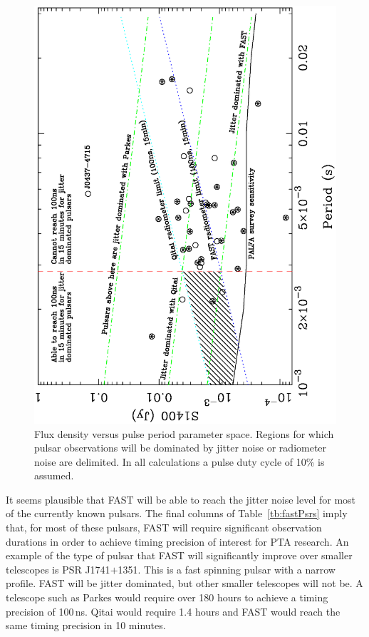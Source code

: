 \documentclass{raa}            %
\begin{document}
\begin{figure}
\begin{center}
\includegraphics[angle=-90,width=12cm]{fastPsrsSelect.ps}
\caption{Flux density versus pulse period parameter space. Regions for which pulsar observations will be dominated by jitter noise or radiometer noise are delimited. In all calculations a pulse duty cycle of 10\% is assumed.} \label{fg:fastPsrsSelect}
\end{center}
\end{figure}

It seems plausible that FAST will be able to reach the jitter noise level for most of the currently known pulsars. The final columns of Table~\ref{tb:fastPsrs}  imply that, for most of these pulsars, FAST will require significant observation durations in order to achieve timing precision of interest for PTA research.  An example of the type of pulsar that FAST will significantly improve over smaller telescopes is PSR J1741$+$1351.  This is a fast spinning pulsar with a narrow profile.  FAST will be jitter dominated, but other smaller telescopes will not be. A telescope such as Parkes would require over 180 hours to achieve a timing precision of 100\,ns.  Qitai would require 1.4 hours and FAST would reach the same timing precision in 10 minutes.
\end{document}
